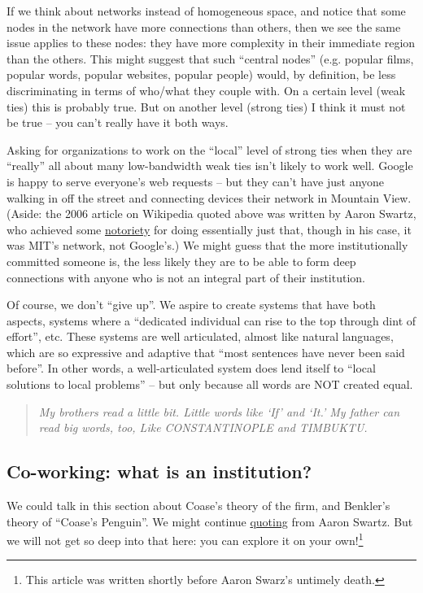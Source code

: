 If we think about networks instead of homogeneous space, and notice that
some nodes in the network have more connections than others, then we see
the same issue applies to these nodes: they have more complexity in
their immediate region than the others. This might suggest that such
``central nodes'' (e.g. popular films, popular words, popular websites,
popular people) would, by definition, be less discriminating in terms of
who/what they couple with. On a certain level (weak ties) this is
probably true. But on another level (strong ties) I think it must not be
true -- you can't really have it both ways.

Asking for organizations to work on the ``local'' level of strong ties
when they are ``really'' all about many low-bandwidth weak ties isn't
likely to work well. Google is happy to serve everyone's web requests --
but they can't have just anyone walking in off the street and connecting
devices their network in Mountain View. (Aside: the 2006 article on
Wikipedia quoted above was written by Aaron Swartz, who achieved some
\href{http://www.wired.com/threatlevel/2011/07/swartz-arrest/}{notoriety}
for doing essentially just that, though in his case, it was MIT's
network, not Google's.) We might guess that the more institutionally
committed someone is, the less likely they are to be able to form deep
connections with anyone who is not an integral part of their
institution.

Of course, we don't ``give up''. We aspire to create systems that have
both aspects, systems where a ``dedicated individual can rise to the top
through dint of effort'', etc. These systems are well articulated,
almost like natural languages, which are so expressive and adaptive that
``most sentences have never been said before''. In other words, a
well-articulated system does lend itself to ``local solutions to local
problems'' -- but only because all words are NOT created equal.

\begin{quote}
\emph{My brothers read a little bit. Little words like `If' and `It.' My
father can read big words, too, Like CONSTANTINOPLE and TIMBUKTU.}
\end{quote}

\subsection{Co-working: what is an institution?}

We could talk in this section about Coase's theory of the firm, and
Benkler's theory of ``Coase's Penguin''. We might continue
\href{http://www.aaronsw.com/weblog/perfectinstitutions}{quoting} from
Aaron Swartz. But we will not get so deep into that here: you can
explore it on your own!\footnote{This article was written shortly before Aaron Swarz's untimely death.}
